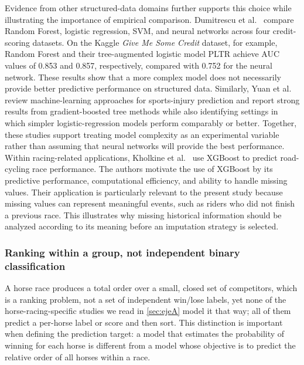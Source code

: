 Evidence from other structured-data domains further supports this choice while
illustrating the importance of empirical comparison. Dumitrescu et
al.~\cite{ejeB_dumitrescu2022} compare Random Forest, logistic regression, SVM,
and neural networks across four credit-scoring datasets. On the Kaggle
\textit{Give Me Some Credit} dataset, for example, Random Forest and their
tree-augmented logistic model PLTR achieve AUC values of 0.853 and 0.857,
respectively, compared with 0.752 for the neural network. These results show
that a more complex model does not necessarily provide better predictive
performance on structured data. Similarly, Yuan et al.~\cite{ejeB_yuan2025}
review machine-learning approaches for sports-injury prediction and report
strong results from gradient-boosted tree methods while also identifying
settings in which simpler logistic-regression models perform comparably or
better. Together, these studies support treating model complexity as an
experimental variable rather than assuming that neural networks will provide
the best performance. Within racing-related applications, Kholkine et
al.~\cite{ejeB_kholkine2020} use XGBoost to predict road-cycling race
performance. The authors motivate the use of XGBoost by its predictive
performance, computational efficiency, and ability to handle missing values.
Their application is particularly relevant to the present study because
missing values can represent meaningful events, such as riders who did not
finish a previous race. This illustrates why missing historical information
should be analyzed according to its meaning before an imputation strategy is
selected.

\subsubsection*{\textbf{Ranking within a group, not independent binary classification}} A horse
race produces a total order over a small, closed set of competitors, which is a
ranking problem, not a set of independent win/lose labels, yet none of the
horse-racing-specific studies we read in \ref{sec:ejeA} model it that way;
all of them predict a per-horse label or score and then sort. This distinction is
important when defining the prediction target: a model that estimates the
probability of winning for each horse is different from a model whose objective
is to predict the relative order of all horses within a race.


